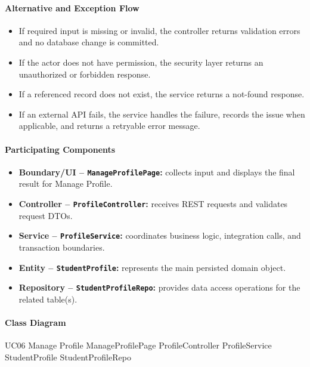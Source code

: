\paragraph{Alternative and Exception Flow}

\begin{itemize}
    \item If required input is missing or invalid, the controller returns validation errors and no database change is committed.
    \item If the actor does not have permission, the security layer returns an unauthorized or forbidden response.
    \item If a referenced record does not exist, the service returns a not-found response.
    \item If an external API fails, the service handles the failure, records the issue when applicable, and returns a retryable error message.
\end{itemize}

\paragraph{Participating Components}

\begin{itemize}
    \item \textbf{Boundary/UI -- \texttt{ManageProfilePage}:} collects input and displays the final result for Manage Profile.
    \item \textbf{Controller -- \texttt{ProfileController}:} receives REST requests and validates request DTOs.
    \item \textbf{Service -- \texttt{ProfileService}:} coordinates business logic, integration calls, and transaction boundaries.
    \item \textbf{Entity -- \texttt{StudentProfile}:} represents the main persisted domain object.
    \item \textbf{Repository -- \texttt{StudentProfileRepo}:} provides data access operations for the related table(s).
\end{itemize}

\paragraph{Class Diagram}

\ClassDiagram
{UC06 Manage Profile}
{ManageProfilePage}
{ProfileController}
{ProfileService}
{StudentProfile}
{StudentProfileRepo}

